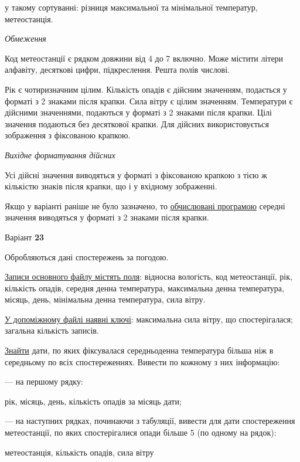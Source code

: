 \documentclass[11pt, ukrainian]{article}
\begin{document}
{\noindent}у такому сортуванні: різниця максимальної та мінімальної температур, метеостанція.


\bigskip\textit{Обмеження}

Код метеостанції є рядком довжини від 4 до 7 включно.
Може містити літери алфавіту, десяткові цифри, підкреслення. Решта полів числові.

Рік є чотиризначним цілим.
Кількість опадів є дійсним значенням, подається у форматі з 2 знаками після крапки.
Сила вітру є цілим значенням.
Температури є дійсними значеннями, подаються у форматі з 2 знаками після крапки.
Цілі значення подаються без десяткової крапки.
Для дійсних використовується зображення з фіксованою крапкою.

\textit{Вихідне форматування дійсних}

Усі дійсні значення виводяться у форматі з фіксованою крапкою з тією ж кількістю знаків після крапки, що і у вхідному зображенні.

Якщо у варіанті раніше не було зазначено, то \underline{обчислювані програмою} середні значення виводяться у форматі з 2 знаками після крапки.


\par
\newpage
{\center Варіант  \No \textbf { 23 }\par}
\bigskip
Обробляються дані спостережень за погодою. 

\underline{Записи основного файлу містять поля}: відносна вологість, код метеостанції, рік, кількість опадів, середня денна температура, максимальна денна температура, місяць, день, мінімальна денна температура, сила вітру.

\underline{У допоміжному файлі наявні ключі}: максимальна сила вітру, що спостерігалася; загальна кількість записів.

\underline{Знайти} дати, по яких фіксувалася середньоденна температура більша ніж в середньому по всіх спостереженнях. Вивести по кожному з них інформацію:\par
{\noindent}--- на першому рядку:\par
рік, місяць, день, кількість опадів за місяць дати;

{\noindent}--- на наступних рядках, починаючи з табуляції, вивести для дати спостереження метеостанції, по яких спостерігалися опади більше 5 (по одному на рядок):\par
метеостанція, кількість опадів, сила вітру
\end{document}
